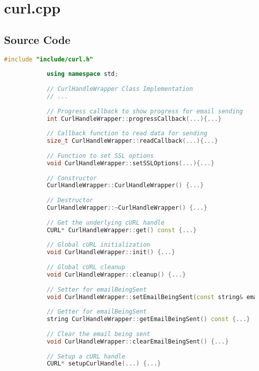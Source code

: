 \documentclass{article}
\begin{document}
	\section{curl.cpp}
	
	\subsection*{Source Code}
	\begin{mdframed}[backgroundcolor=background, hidealllines=false, innerleftmargin=15pt, innerrightmargin=5pt, innertopmargin=0pt, innerbottommargin=-5pt, linecolor=accent]
		\begin{lstlisting}[language=C++]
			#include "include/curl.h"
			
			using namespace std;
			
			// CurlHandleWrapper Class Implementation
			// ...
			
			// Progress callback to show progress for email sending
			int CurlHandleWrapper::progressCallback(...){...}
			
			// Callback function to read data for sending
			size_t CurlHandleWrapper::readCallback(...){...}
			
			// Function to set SSL options
			void CurlHandleWrapper::setSSLOptions(...){...}
			
			// Constructor
			CurlHandleWrapper::CurlHandleWrapper() {...}
			
			// Destructor
			CurlHandleWrapper::~CurlHandleWrapper() {...}
			
			// Get the underlying cURL handle
			CURL* CurlHandleWrapper::get() const {...}
			
			// Global cURL initialization
			void CurlHandleWrapper::init() {...}
			
			// Global cURL cleanup
			void CurlHandleWrapper::cleanup() {...}
			
			// Setter for emailBeingSent
			void CurlHandleWrapper::setEmailBeingSent(const string& email) {...}
			
			// Getter for emailBeingSent
			string CurlHandleWrapper::getEmailBeingSent() const {...}
			
			// Clear the email being sent
			void CurlHandleWrapper::clearEmailBeingSent() {...}
			
			// Setup a cURL handle
			CURL* setupCurlHandle(...) {...}
		\end{lstlisting}
	\end{mdframed}
	
\end{document}
